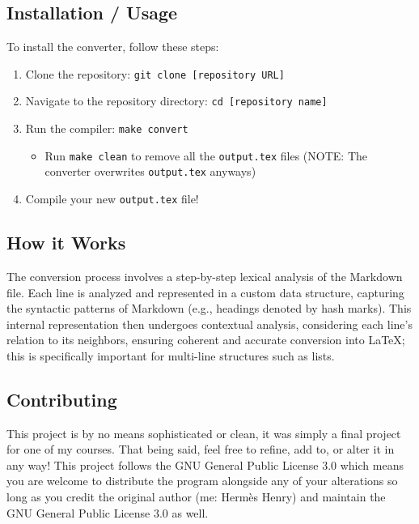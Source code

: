 \documentclass{article}
\begin{document}
\subsection{Installation / Usage}

To install the converter, follow these steps:

\begin{enumerate}
    \item Clone the repository: \texttt{git clone [repository URL]}
    \item Navigate to the repository directory: \texttt{cd [repository name]}
    \item Run the compiler: \texttt{make convert}
\begin{itemize}
    \item  Run \texttt{make clean} to remove all the \texttt{output.tex} files (NOTE: The converter overwrites \texttt{output.tex} anyways)
\end{itemize}
    \item Compile your new \texttt{output.tex} file!
\end{enumerate}


\subsection{How it Works}

The conversion process involves a step-by-step lexical analysis of the Markdown file. Each line is analyzed and represented in a custom data structure, capturing the syntactic patterns of Markdown (e.g., headings denoted by hash marks). This internal representation then undergoes contextual analysis, considering each line’s relation to its neighbors, ensuring coherent and accurate conversion into LaTeX; this is specifically important for multi-line structures such as lists.


\subsection{Contributing}

This project is by no means sophisticated or clean, it was simply a final project for one of my courses. That being said, feel free to refine, add to, or alter it in any way! This project follows the GNU General Public License 3.0 which means you are welcome to distribute the program alongside any of your alterations so long as you credit the original author (me: Hermès Henry) and maintain the GNU General Public License 3.0 as well.
\end{document}
